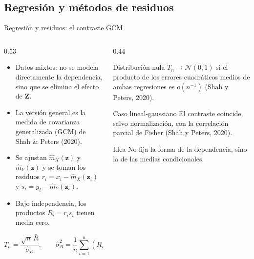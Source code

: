 \documentclass[aspectratio=169,11pt]{beamer}
\newcommand{\srccite}[1]{{\scriptsize\color{upmgray}(#1)}}
\begin{document}
\subsection{Regresión y métodos de residuos}

\begin{frame}[t]{Regresión y residuos: el contraste GCM}
  \begin{columns}[T,onlytextwidth]
    \begin{column}{0.53\textwidth}
      \begin{itemize}
        \item Datos mixtos: no se modela directamente la dependencia, sino que
              se elimina el efecto de $\mathbf Z$.
        \item La versión general es la \alert{medida de covarianza
              generalizada (GCM)} de Shah \& Peters (2020).
        \item Se ajustan $\hat m_X(\mathbf z)$ y $\hat m_Y(\mathbf z)$ y se
              toman los residuos
              $r_i=x_i-\hat m_X(\mathbf z_i)$ y
              $s_i=y_i-\hat m_Y(\mathbf z_i)$.
        \item Bajo independencia, los productos $R_i=r_i s_i$ tienen media
              cero.
      \end{itemize}
      \[
        T_n=\frac{\sqrt n\,\bar R}{\hat\sigma_R},
        \qquad
        \hat\sigma_R^2=\frac1n\sum_{i=1}^n(R_i-\bar R)^2.
      \]
    \end{column}
    \begin{column}{0.44\textwidth}
      \begin{block}{Distribución nula}
        $T_n\longrightarrow\mathcal N(0,1)$ si el producto de los errores
        cuadráticos medios de ambas regresiones es $o(n^{-1})$
        \srccite{Shah y Peters, 2020}.
      \end{block}
      \begin{exampleblock}{Caso lineal-gaussiano}
        El contraste coincide, salvo normalización, con la correlación parcial
        de Fisher \srccite{Shah y Peters, 2020}.
      \end{exampleblock}
      \begin{alertblock}{Idea}
        No fija la forma de la dependencia, sino la de las medias
        condicionales.
      \end{alertblock}
    \end{column}
  \end{columns}
\end{frame}
\end{document}
